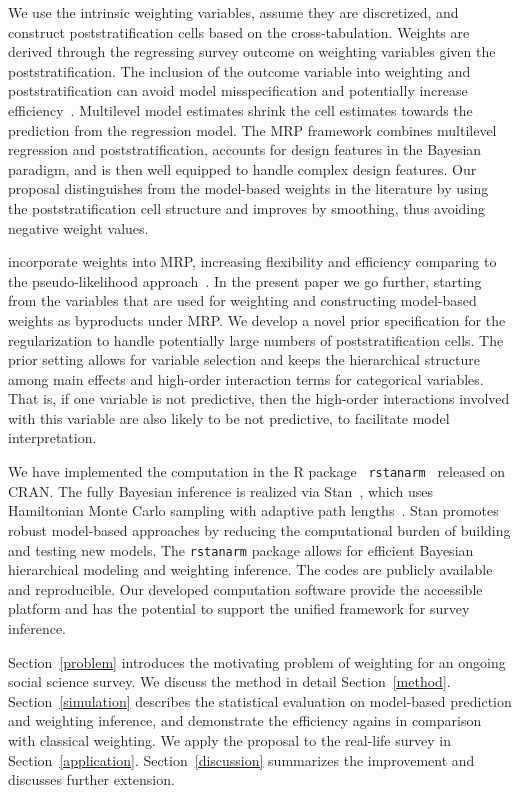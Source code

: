 \documentclass[11pt]{article}
\numberwithin{figure}{section}
\numberwithin{table}{section}
\numberwithin{equation}{section}
\begin{document}
We use the intrinsic weighting variables, assume they are discretized, and
construct poststratification cells based on the cross-tabulation. Weights are
derived through the regressing survey outcome on weighting variables given the
poststratification. The inclusion of the outcome variable into weighting and
poststratification can avoid model misspecification and potentially increase
efficiency~\citep{fuller09}. Multilevel model estimates shrink the cell
estimates towards the prediction from the regression model. The MRP framework
combines multilevel regression and poststratification, accounts for design
features in the Bayesian paradigm, and is then well equipped to handle complex
design features. Our proposal distinguishes from the model-based weights in the
literature by using the poststratification cell structure and improves by
smoothing, thus avoiding negative weight values.

\cite{bnfp:ba15} incorporate weights into MRP, increasing flexibility and
efficiency comparing to the pseudo-likelihood approach~\citep{pfeffermann93}.
In the present paper we go further, starting from the variables that are used
for weighting and constructing model-based weights as byproducts under MRP. We
develop a novel prior specification for the regularization to handle
potentially large numbers of poststratification cells. The prior setting allows
for variable selection and keeps the hierarchical structure among main effects
and high-order interaction terms for categorical variables. That is, if one
variable is not predictive, then the high-order interactions involved with this
variable are also likely to be not predictive, to facilitate model
interpretation.

We have implemented the computation in the R package {\tt
rstanarm}~\citep{rstanarm} released on CRAN. The fully Bayesian inference is
realized via Stan~\citep{stan-software:2013,stan-manual:2013}, which uses
Hamiltonian Monte Carlo sampling with adaptive path
lengths~\citep{hoffman-gelman:2012}.  Stan promotes robust model-based
approaches by reducing the computational burden of building and testing new
models. The {\tt rstanarm} package allows for efficient Bayesian hierarchical
modeling and weighting inference. The codes are publicly available and
reproducible. Our developed computation software provide the accessible
platform and has the potential to support the unified framework for survey
inference.

Section~\ref{problem} introduces the motivating problem of weighting for an
ongoing social science survey. We discuss the method in detail
Section~\ref{method}. Section~\ref{simulation} describes the statistical
evaluation on model-based prediction and weighting inference, and demonstrate
the efficiency agains in comparison with classical weighting. We apply the
proposal to the real-life survey in Section~\ref{application}.
Section~\ref{discussion} summarizes the improvement and discusses further
extension.
\end{document}

